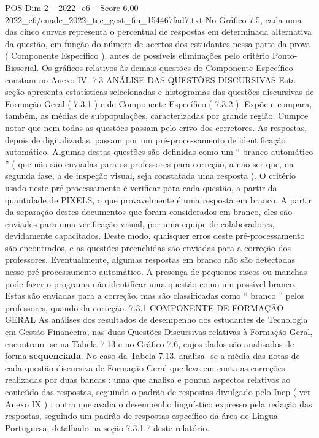 \begin{textsample}{POS Dim 2 – 2022\_c6 – Score 6.00 – 2022\_c6/enade\_2022\_tec\_gest\_fin\_154467fad7.txt}
No Gráfico 7.5, cada uma das cinco curvas representa o percentual de respostas em determinada alternativa da questão, em função do número de acertos dos estudantes nessa parte da prova ( Componente Específico ), antes de possíveis eliminações pelo critério Ponto-Bisserial.
Os gráficos relativos às demais questões do Componente Específico constam no Anexo IV. 7.3 ANÁLISE DAS QUESTÕES DISCURSIVAS Esta seção apresenta estatísticas selecionadas e histogramas das questões discursivas de Formação Geral ( 7.3.1 ) e de Componente Específico ( 7.3.2 ).
Expõe e compara, também, as médias de subpopulações, caracterizadas por grande região.
Cumpre notar que nem todas as questões passam pelo crivo dos corretores.
As respostas, depois de digitalizadas, passam por um pré-processamento de identificação automático.
Algumas destas questões são definidas como um “ branco automático ” ( que não são enviadas para os professores para correção, a não ser que, na segunda fase, a de inspeção visual, seja constatada uma resposta ).
O critério usado neste pré-processamento é verificar para cada questão, a partir da quantidade de PIXELS, o que provavelmente é uma resposta em branco.
A partir da separação destes documentos que foram considerados em branco, eles são enviados para uma verificação visual, por uma equipe de colaboradores, devidamente capacitados.
Deste modo, quaisquer erros deste pré-processamento são encontrados, e as questões preenchidas são enviadas para a correção dos professores.
Eventualmente, algumas respostas em branco não são detectadas nesse pré-processamento automático.
A presença de pequenos riscos ou manchas pode fazer o programa não identificar uma questão como um possível branco.
Estas são enviadas para a correção, mas são classificadas como “ branco ” pelos professores, quando da correção. 7.3.1 COMPONENTE DE FORMAÇÃO GERAL As análises dos resultados de desempenho dos estudantes de Tecnologia em Gestão Financeira, nas duas Questões Discursivas relativas à Formação Geral, encontram -se na Tabela 7.13 e no Gráfico 7.6, cujos dados são analisados de forma \textbf{sequenciada}.
No caso da Tabela 7.13, analisa -se a média das notas de cada questão discursiva de Formação Geral que leva em conta as correções realizadas por duas bancas : uma que analisa e pontua aspectos relativos ao conteúdo das respostas, seguindo o padrão de respostas divulgado pelo Inep ( ver Anexo IX ) ; outra que avalia o desempenho linguístico expresso pela redação das respostas, seguindo um padrão de respostas específico da área de Língua Portuguesa, detalhado na seção 7.3.1.7 deste relatório.

\end{textsample}
